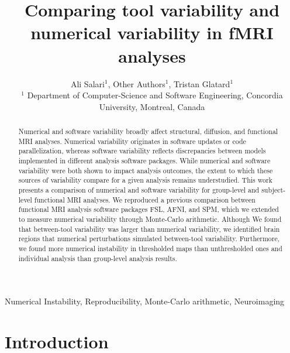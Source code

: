 \documentclass[conference]{IEEEtran}
\begin{document}
\newcommand{\fslspm}{FSL-SPM\xspace}
\newcommand{\fslafni}{FSL-AFNI\xspace}
\newcommand{\afnispm}{AFNI-SPM\xspace}
\newcommand{\tristan}[1]{\color{orange}\textbf{From Tristan:} #1\color{black}\xspace}
\newcommand{\ali}[2]{\color{green}\textbf{Ali:} #1\color{black}\xspace}



\title{Comparing tool variability and numerical variability in fMRI analyses}

\author{Ali Salari$^1$, Other Authors$^1$, Tristan Glatard$^1$ \\
$^1$ Department of Computer-Science and Software Engineering, Concordia University, Montreal, Canada}

\maketitle
\begin{abstract}

Numerical and software variability broadly affect structural, diffusion, and functional MRI analyses. Numerical
variability originates in software updates or code
parallelization, whereas software variability reflects discrepancies between
models implemented in different analysis software packages. While numerical
and software variability were both shown to impact analysis outcomes, the
extent to which these sources of variability compare for a given
analysis remains understudied. This work presents a comparison of
numerical and software variability for group-level and subject-level functional MRI analyses.
We reproduced a previous comparison between functional MRI analysis
software packages FSL, AFNI, and SPM, which we extended to measure
numerical variability through Monte-Carlo arithmetic.
Although We found that between-tool variability was larger than numerical variability,
we identified brain regions that numerical perturbations simulated between-tool variability.
Furthermore, we found more numerical instability in thresholded maps than unthresholded ones
and individual analysis than group-level analysis results.

\end{abstract}

\begin{IEEEkeywords}
  Numerical Instability, Reproducibility, Monte-Carlo arithmetic, Neuroimaging
\end{IEEEkeywords}


\section{Introduction}
\end{document}
